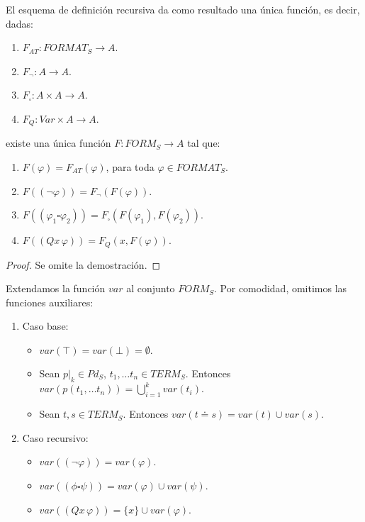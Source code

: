  \begin{prop} El esquema de definición recursiva da como resultado una única función, es decir, dadas:
\begin{enumerate}
    \item $F_{AT}: FORMAT_S \rightarrow A$.
    \item $F_{\neg}: A \rightarrow A$.
    \item $F_{\square}: A \times A \rightarrow A$.
    \item $F_Q:Var\times A\rightarrow A$.
\end{enumerate}
existe una única función $F: FORM_S \rightarrow A$ tal que:
\begin{enumerate}
    \item $F(\varphi) = F_{AT}(\varphi)$, para toda $\varphi \in FORMAT_S$.
    \item $F((\neg \varphi)) = F_{\neg}(F(\varphi))$.
    \item $F((\varphi_1 \square \varphi_2)) = F_{\square}(F(\varphi_1), F(\varphi_2))$.
    \item $F((Qx\,\varphi))=F_Q(x,F(\varphi))$.
\end{enumerate}
\begin{proof}
     Se omite la demostración.
\end{proof}
\end{prop}


\begin{example}
Extendamos la función $var$ al conjunto $FORM_S$. Por comodidad, omitimos las funciones auxiliares:
\begin{enumerate}
    \item Caso base:
        \begin{itemize}
            \item $var(\top) = var(\bot) = \emptyset.$
            \item Sean $p|_k \in Pd_S$, $t_1, \dots t_n \in TERM_S$. Entonces $var(p(t_1, \dots t_n)) = \bigcup\limits_{i=1}^{k} var(t_i).$
            \item Sean $t, s \in TERM_S$. Entonces $var(t \doteq s) = var(t) \cup var(s)$.
        \end{itemize} 
    \item Caso recursivo:
        \begin{itemize}
            \item $var((\neg \varphi)) = var(\varphi)$.
            \item $var((\phi \square \psi)) = var(\varphi) \cup var(\psi)$.
            \item $var((Qx \, \varphi)) = \{x\} \cup var(\varphi)$.
        \end{itemize}
\end{enumerate}
\end{example}

